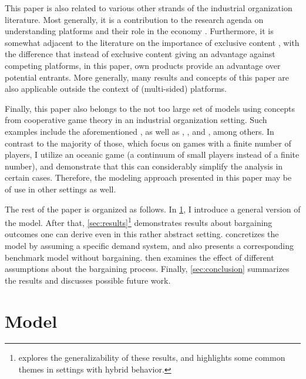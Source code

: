 \documentclass[a4paper]{article}
\begin{document}
This paper is also related to various other strands of the industrial organization literature.
Most generally, it is a contribution to the research agenda on understanding platforms and their role in the economy \parencite[e.g.][]{rochet2003platform,hagiu2004optimal,armstrong2006competition,evans2011platform,lee2014competing}.
Furthermore, it is somewhat adjacent to the literature on the importance of exclusive content \parencite[e.g.][]{hagiu2011exclusivity,lee2013vertical,dou2014sell,weeds2016tv}, with the difference that instead of exclusive content giving an advantage against competing platforms, in this paper, own products provide an advantage over potential entrants.
More generally, many results and concepts of this paper are also applicable outside the context of (multi-sided) platforms.

Finally, this paper also belongs to the not too large set of models using concepts from cooperative game theory in an industrial organization setting.
Such examples include the aforementioned \textcite{montez2007downstream}, as well as \textcite{hart1990property}, \textcite{levy1997individual}, \textcite{inderst2003bargaining} and \textcite{brugemann2019intra}, among others.
In contrast to the majority of those, which focus on games with a finite number of players, I utilize an oceanic game (a continuum of small players instead of a finite number), and demonstrate that this can considerably simplify the analysis in certain cases.
Therefore, the modeling approach presented in this paper may be of use in other settings as well.

The rest of the paper is organized as follows.
In \cref{sec:model}, I introduce a general version of the model.
After that, \cref{sec:results}\footnote{
     explores the generalizability of these results, and highlights some common themes in settings with hybrid behavior.
} demonstrates results about bargaining outcomes one can derive even in this rather abstract setting.
 concretizes the model by assuming a specific demand system, and also presents a corresponding benchmark model without bargaining.
 then examines the effect of different assumptions about the bargaining process.
Finally, \cref{sec:conclusion} summarizes the results and discusses possible future work.


\section{Model}
\label{sec:model}
\end{document}
